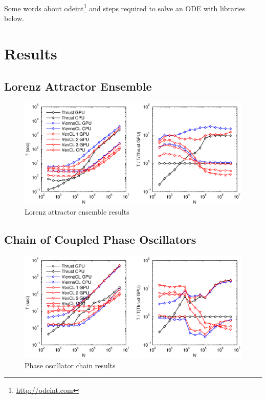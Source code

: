 \documentclass[1p]{elsarticle}
\begin{document}
Some words about odeint\footnote{\href{http://odeint.com}{http://odeint.com}}
and steps required to solve an ODE with libraries below.

\section{Results}

\subsection{Lorenz Attractor Ensemble}

\begin{figure}
    \begin{center}
	\includegraphics[width=\textwidth]{data/lorenz_ensemble/lorenz_ensemble}
    \end{center}
    \caption{Lorenz attractor ensemble results}
    \label{fig:lorenz:perf}
\end{figure}

\subsection{Chain of Coupled Phase Oscillators}

\begin{figure}
    \begin{center}
	\includegraphics[width=\textwidth]{data/phase_oscillator_chain/phase_oscillator}
    \end{center}
    \caption{Phase oscillator chain results}
    \label{fig:phase:perf}
\end{figure}
\end{document}

